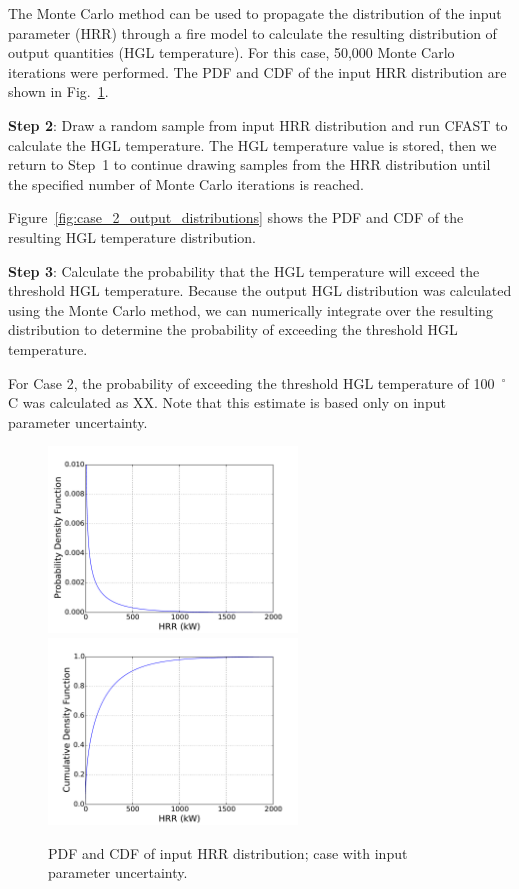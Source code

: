 \documentclass[12pt]{article}
\begin{document}
The Monte Carlo method can be used to propagate the distribution of the input parameter (HRR) through a fire model to calculate the resulting distribution of output quantities (HGL temperature). For this case, 50,000 Monte Carlo iterations were performed. The PDF and CDF of the input HRR distribution are shown in Fig.~\ref{fig:case_2_input_distributions}.

\textbf{Step 2}: Draw a random sample from input HRR distribution and run CFAST to calculate the HGL temperature. The HGL temperature value is stored, then we return to Step~1 to continue drawing samples from the HRR distribution until the specified number of Monte Carlo iterations is reached.

Figure~\ref{fig:case_2_output_distributions} shows the PDF and CDF of the resulting HGL temperature distribution.

\textbf{Step 3}: Calculate the probability that the HGL temperature will exceed the threshold HGL temperature. Because the output HGL distribution was calculated using the Monte Carlo method, we can numerically integrate over the resulting distribution to determine the probability of exceeding the threshold HGL temperature.

For Case 2, the probability of exceeding the threshold HGL temperature of 100~$^\circ$C was calculated as XX. Note that this estimate is based only on input parameter uncertainty.


\clearpage


\begin{figure}[p]
\includegraphics[width=2.6in]{Figures/input_PDF}
\includegraphics[width=2.6in]{Figures/input_CDF}
\caption{PDF and CDF of input HRR distribution; case with input parameter uncertainty.}
\label{fig:case_2_input_distributions}
\end{figure}
\end{document}
